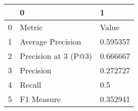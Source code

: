 \begin{tabular}{lll}
\toprule
{} &                     0 &         1 \\
\midrule
0 &                Metric &     Value \\
1 &     Average Precision &  0.595357 \\
2 &  Precision at 3 (P@3) &  0.666667 \\
3 &             Precision &  0.272727 \\
4 &                Recall &       0.5 \\
5 &            F1 Measure &  0.352941 \\
\bottomrule
\end{tabular}
